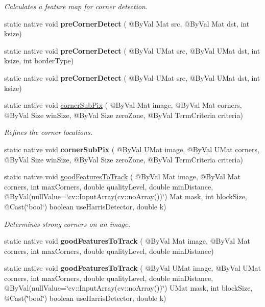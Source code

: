 \begin{DoxyCompactItemize}
\begin{DoxyCompactList}\small\item\em Calculates a feature map for corner detection. \end{DoxyCompactList}\item 
static native void {\bfseries pre\+Corner\+Detect} ( @By\+Val Mat src, @By\+Val Mat dst, int ksize)
\item 
static native void {\bfseries pre\+Corner\+Detect} ( @By\+Val U\+Mat src, @By\+Val U\+Mat dst, int ksize, int border\+Type)
\item 
static native void {\bfseries pre\+Corner\+Detect} ( @By\+Val U\+Mat src, @By\+Val U\+Mat dst, int ksize)
\item 
static native void \hyperlink{group__imgproc__feature_ga45fec6a2998978719aaedb9aad2cbae6}{corner\+Sub\+Pix} ( @By\+Val Mat image, @By\+Val Mat corners, @By\+Val Size win\+Size, @By\+Val Size zero\+Zone, @By\+Val Term\+Criteria criteria)
\begin{DoxyCompactList}\small\item\em Refines the corner locations. \end{DoxyCompactList}\item 
static native void {\bfseries corner\+Sub\+Pix} ( @By\+Val U\+Mat image, @By\+Val U\+Mat corners, @By\+Val Size win\+Size, @By\+Val Size zero\+Zone, @By\+Val Term\+Criteria criteria)
\item 
static native void \hyperlink{group__imgproc__feature_gac59ef9f79071cae35c509e388d80e4f5}{good\+Features\+To\+Track} ( @By\+Val Mat image, @By\+Val Mat corners, int max\+Corners, double quality\+Level, double min\+Distance, @By\+Val(null\+Value=\char`\"{}cv\+::\+Input\+Array(cv\+::no\+Array())\char`\"{}) Mat mask, int block\+Size, @Cast(\char`\"{}bool\char`\"{}) boolean use\+Harris\+Detector, double k)
\begin{DoxyCompactList}\small\item\em Determines strong corners on an image. \end{DoxyCompactList}\item 
static native void {\bfseries good\+Features\+To\+Track} ( @By\+Val Mat image, @By\+Val Mat corners, int max\+Corners, double quality\+Level, double min\+Distance)
\item 
static native void {\bfseries good\+Features\+To\+Track} ( @By\+Val U\+Mat image, @By\+Val U\+Mat corners, int max\+Corners, double quality\+Level, double min\+Distance, @By\+Val(null\+Value=\char`\"{}cv\+::\+Input\+Array(cv\+::no\+Array())\char`\"{}) U\+Mat mask, int block\+Size, @Cast(\char`\"{}bool\char`\"{}) boolean use\+Harris\+Detector, double k)

\end{DoxyCompactItemize}
